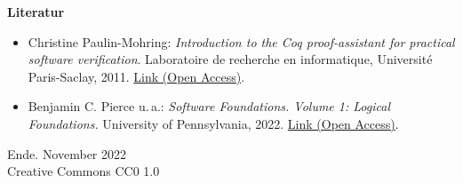 \documentclass[8pt]{beamer}
\newcommand{\modest}[1]{{\small\color{gray}#1}}
\newcommand{\strong}[1]{\textsf{\textbf{#1}}}
\begin{document}
\begin{frame}
\strong{Literatur}
\begin{itemize}
\item Christine Paulin-Mohring: \emph{Introduction to the Coq
proof-assistant for practical software verification}. Laboratoire de
recherche en informatique, Université Paris-Saclay, 2011.
\href{https://www.lri.fr/~paulin/}{Link (Open Access)}.
\item Benjamin C. Pierce u.\,a.:
\emph{Software Foundations. Volume 1: Logical Foundations.}
University of Pennsylvania, 2022.
\href{https://softwarefoundations.cis.upenn.edu/}{Link (Open Access)}.
\end{itemize}
\end{frame}

\begin{frame}
Ende.
\vfill\hfill\modest{November 2022}\\
\hfill\modest{Creative Commons CC0 1.0}
\end{frame}
\end{document}
